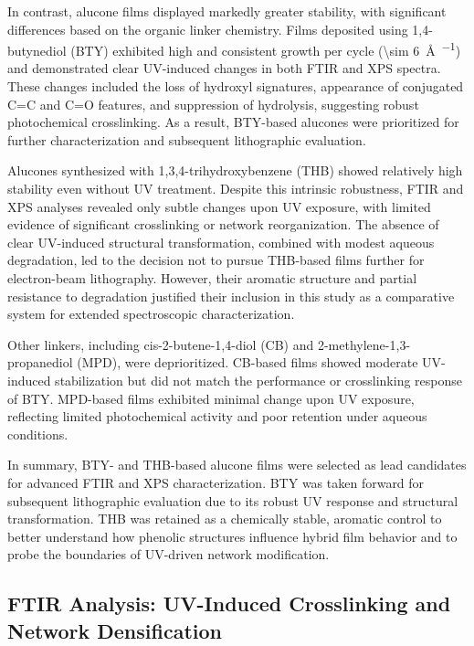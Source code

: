 In contrast, alucone films displayed markedly greater stability, with significant differences based on the organic linker chemistry. Films deposited using 1,4-butynediol (BTY) exhibited high and consistent growth per cycle (\SI{\sim 6}{\angstrom\per\cycle}) and demonstrated clear UV-induced changes in both FTIR and XPS spectra. These changes included the loss of hydroxyl signatures, appearance of conjugated C=C and C=O features, and suppression of hydrolysis, suggesting robust photochemical crosslinking. As a result, BTY-based alucones were prioritized for further characterization and subsequent lithographic evaluation.

Alucones synthesized with 1,3,4-trihydroxybenzene (THB) showed relatively high stability even without UV treatment. Despite this intrinsic robustness, FTIR and XPS analyses revealed only subtle changes upon UV exposure, with limited evidence of significant crosslinking or network reorganization. The absence of clear UV-induced structural transformation, combined with modest aqueous degradation, led to the decision not to pursue THB-based films further for electron-beam lithography. However, their aromatic structure and partial resistance to degradation justified their inclusion in this study as a comparative system for extended spectroscopic characterization.

Other linkers, including cis-2-butene-1,4-diol (CB) and 2-methylene-1,3-propanediol (MPD), were deprioritized. CB-based films showed moderate UV-induced stabilization but did not match the performance or crosslinking response of BTY. MPD-based films exhibited minimal change upon UV exposure, reflecting limited photochemical activity and poor retention under aqueous conditions.

In summary, BTY- and THB-based alucone films were selected as lead candidates for advanced FTIR and XPS characterization. BTY was taken forward for subsequent lithographic evaluation due to its robust UV response and structural transformation. THB was retained as a chemically stable, aromatic control to better understand how phenolic structures influence hybrid film behavior and to probe the boundaries of UV-driven network modification.




\subsection{FTIR Analysis: UV-Induced Crosslinking and Network Densification}

